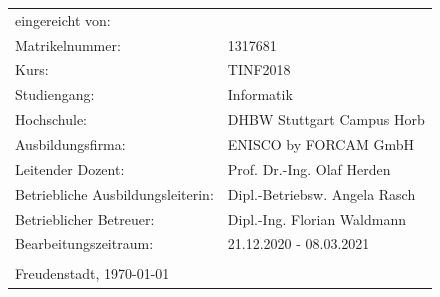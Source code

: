 \begin{tabular}{ll}
    eingereicht von:\hspace{1cm} & \author{}
    \tabularnewline
    Matrikelnummer: & 1317681
    \tabularnewline
    Kurs: & TINF2018
    \tabularnewline
    Studiengang: & Informatik
    \tabularnewline
    Hochschule: & DHBW Stuttgart Campus Horb
    \tabularnewline
    Ausbildungsfirma: & ENISCO by FORCAM GmbH
    \tabularnewline
    Leitender Dozent: & Prof. Dr.-Ing. Olaf Herden
    \tabularnewline
    Betriebliche Ausbildungsleiterin: & Dipl.-Betriebsw. Angela Rasch
    \tabularnewline
    Betrieblicher Betreuer: & Dipl.-Ing. Florian Waldmann
    \tabularnewline
    Bearbeitungszeitraum: & 21.12.2020 - 08.03.2021
    \tabularnewline
    \tabularnewline
    \multicolumn{2}{l}{Freudenstadt, \today}
    \tabularnewline
\end{tabular}

\begin{flushleft}
    \newpage{}
    \par
\end{flushleft}